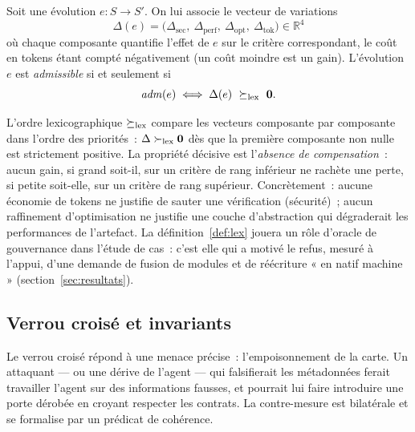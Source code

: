 \begin{defn}\label{def:lex}
Soit une évolution $e : S \to S'$. On lui associe le vecteur de variations
\begin{equation}\label{eq:delta}
\Delta(e) = \bigl(\Delta_{\mathrm{sec}},\ \Delta_{\mathrm{perf}},\
\Delta_{\mathrm{opt}},\ \Delta_{\mathrm{tok}}\bigr) \in \mathbb{R}^4
\end{equation}
où chaque composante quantifie l’effet de $e$ sur le critère correspondant,
le coût en tokens étant compté négativement (un coût moindre est un gain).
L’évolution $e$ est \emph{admissible} si et seulement si
\begin{equation}\label{eq:lex}
\mathit{adm}(e) \;\Longleftrightarrow\; \Delta(e)\ \lexsucceq\ \mathbf{0}.
\end{equation}
\end{defn}

L’ordre lexicographique $\succeq_{\mathrm{lex}}$ compare les vecteurs composante par
composante dans l’ordre des priorités~: $\Delta \succ_{\mathrm{lex}} \mathbf{0}$ dès que
la première composante non nulle est strictement positive. La propriété
décisive est l’\emph{absence de compensation}~: aucun gain, si grand soit-il,
sur un critère de rang inférieur ne rachète une perte, si petite soit-elle,
sur un critère de rang supérieur. Concrètement~: aucune économie de tokens
ne justifie de sauter une vérification (sécurité)~; aucun raffinement
d’optimisation ne justifie une couche d’abstraction qui dégraderait les
performances de l’artefact. La définition~\ref{def:lex} jouera un rôle
d’oracle de gouvernance dans l’étude de cas~: c’est elle qui a motivé le
refus, mesuré à l’appui, d’une demande de fusion de modules et de
réécriture « en natif machine » (section~\ref{sec:resultats}).

\subsection{Verrou croisé et invariants}\label{sec:verrou}

Le verrou croisé répond à une menace précise~: l’empoisonnement de la
carte. Un attaquant — ou une dérive de l’agent — qui falsifierait les
métadonnées ferait travailler l’agent sur des informations fausses, et
pourrait lui faire introduire une porte dérobée en croyant respecter les
contrats. La contre-mesure est bilatérale et se formalise par un prédicat
de cohérence.

